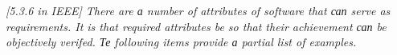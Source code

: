 \textit{[5.3.6 in IEEE] There are а number of attributes of software that сап serve as requirements. It is that required
attributes be so that their achievement сап be objectively verifed. Те following items provide а
partial list of examples.}